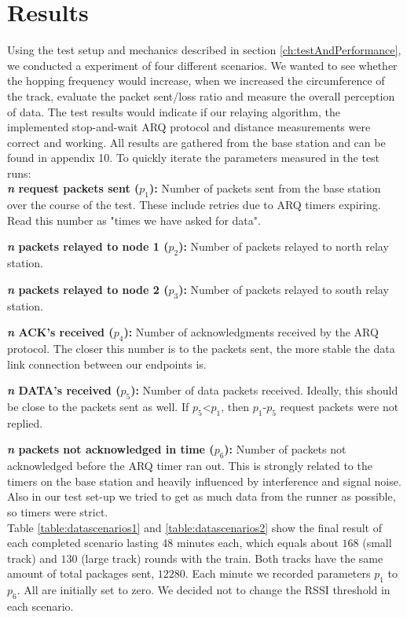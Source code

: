 \section{Results}\label{ch:results}

Using the test setup and mechanics described in section \ref{ch:testAndPerformance}, we conducted a experiment of four different scenarios. We wanted to see whether the hopping frequency would increase, when we increased the circumference of the track, evaluate the packet sent/loss ratio and measure the overall perception of data. The test results would indicate if our relaying algorithm, the implemented stop-and-wait ARQ protocol and distance measurements were correct and working. All results are gathered from the base station and can be found in appendix 10. To quickly iterate the parameters measured in the test runs: \\

\noindent \textbf{\textit{n} request packets sent ($p_1$):} Number of packets sent from the base station over the course of the test. These include retries due to ARQ timers expiring. Read this number as "times we have asked for data".

\noindent \textbf{\textit{n} packets relayed to node 1 ($p_2$):} Number of packets relayed to north relay station.

\noindent \textbf{\textit{n} packets relayed to node 2 ($p_3$):} Number of packets relayed to south relay station.

\noindent \textbf{\textit{n} ACK's received ($p_4$):} Number of acknowledgments received by the ARQ protocol. The closer this number is to the packets sent, the more stable the data link connection between our endpoints is.

\noindent \textbf{\textit{n} DATA's received ($p_5$):} Number of data packets received. Ideally, this should be close to the packets sent as well. If $p_5$<$p_1$, then $p_1$-$p_5$ request packets were not replied.

\noindent \textbf{\textit{n} packets not acknowledged in time ($p_6$):} Number of packets not acknowledged before the ARQ timer ran out. This is strongly related to the timers on the base station and heavily influenced by interference and signal noise. Also in our test set-up we tried to get as much data from the runner as possible, so timers were strict.\\

\noindent Table \ref{table:datascenarios1} and \ref{table:datascenarios2} show the final result of each completed scenario lasting 48 minutes each, which equals about $168$ (small track) and $130$ (large track) rounds with the train. Both tracks have the same amount of total packages sent, $12280$. Each minute we recorded parameters $p_1$ to $p_6$. All are initially set to zero. We decided not to change the RSSI threshold in each scenario.

